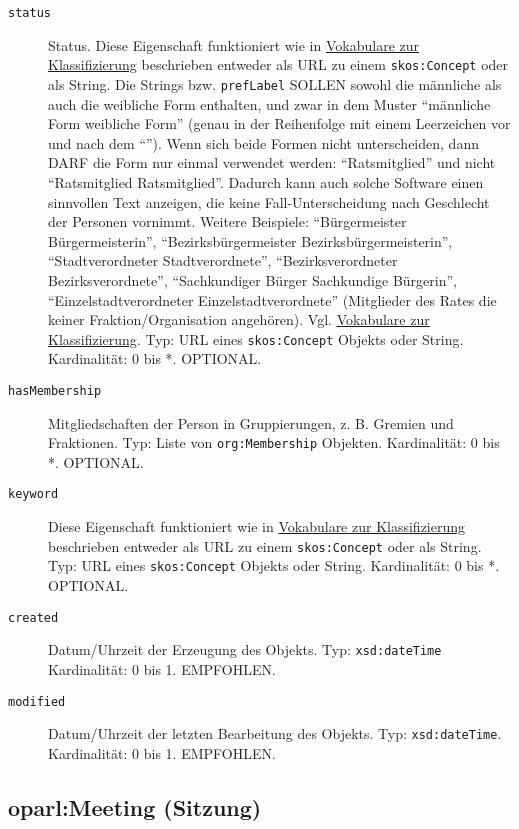 \documentclass[,a4paper]{article}
\begin{document}
\begin{description}
\item[\texttt{status}]
Status. Diese Eigenschaft funktioniert wie in
\hyperref[vokabulareux5fklassifizierung]{Vokabulare zur Klassifizierung}
beschrieben entweder als URL zu einem \texttt{skos:Concept} oder als
String. Die Strings bzw. \texttt{prefLabel} SOLLEN sowohl die männliche
als auch die weibliche Form enthalten, und zwar in dem Muster
``männliche Form \textbar{} weibliche Form'' (genau in der Reihenfolge
mit einem Leerzeichen vor und nach dem ``\textbar{}''). Wenn sich beide
Formen nicht unterscheiden, dann DARF die Form nur einmal verwendet
werden: ``Ratsmitglied'' und nicht ``Ratsmitglied \textbar{}
Ratsmitglied''. Dadurch kann auch solche Software einen sinnvollen Text
anzeigen, die keine Fall-Unterscheidung nach Geschlecht der Personen
vornimmt. Weitere Beispiele: ``Bürgermeister \textbar{}
Bürgermeisterin'', ``Bezirksbürgermeister \textbar{}
Bezirksbürgermeisterin'', ``Stadtverordneter \textbar{}
Stadtverordnete'', ``Bezirksverordneter \textbar{} Bezirksverordnete'',
``Sachkundiger Bürger \textbar{} Sachkundige Bürgerin'',
``Einzelstadtverordneter \textbar{} Einzelstadtverordnete'' (Mitglieder
des Rates die keiner Fraktion/Organisation angehören). Vgl.
\hyperref[vokabulareux5fklassifizierung]{Vokabulare zur
Klassifizierung}. Typ: URL eines \texttt{skos:Concept} Objekts oder
String. Kardinalität: 0 bis *. OPTIONAL.
\item[\texttt{hasMembership}]
Mitgliedschaften der Person in Gruppierungen, z. B. Gremien und
Fraktionen. Typ: Liste von \texttt{org:Membership} Objekten.
Kardinalität: 0 bis *. OPTIONAL.
\item[\texttt{keyword}]
Diese Eigenschaft funktioniert wie in
\hyperref[vokabulareux5fklassifizierung]{Vokabulare zur Klassifizierung}
beschrieben entweder als URL zu einem \texttt{skos:Concept} oder als
String. Typ: URL eines \texttt{skos:Concept} Objekts oder String.
Kardinalität: 0 bis *. OPTIONAL.
\item[\texttt{created}]
Datum/Uhrzeit der Erzeugung des Objekts. Typ: \texttt{xsd:dateTime}
Kardinalität: 0 bis 1. EMPFOHLEN.
\item[\texttt{modified}]
Datum/Uhrzeit der letzten Bearbeitung des Objekts. Typ:
\texttt{xsd:dateTime}. Kardinalität: 0 bis 1. EMPFOHLEN.
\end{description}

\subsection{oparl:Meeting (Sitzung)}\label{oparlux5fmeeting}
\end{document}
